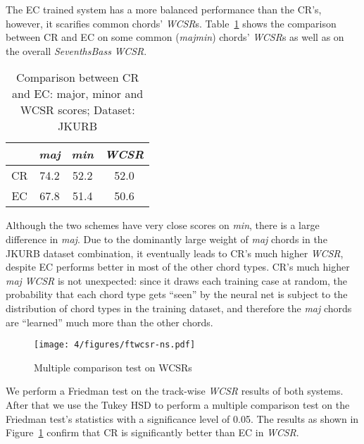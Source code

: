 The EC trained system has a more balanced performance than the CR's, however, it scarifies common chords' \textit{WCSR}s. Table~\ref{tab:4-wcsr-ns} shows the comparison between CR and EC on some common (\textit{majmin}) \cite{burgoyne2011expert} chords' \textit{WCSR}s as well as on the overall \textit{SeventhsBass} \textit{WCSR}.
\begin{table}[htb]
	\caption{Comparison between CR and EC: major, minor and WCSR scores; Dataset: JKURB}
	\centering
	\scriptsize
	\begin{tabular}{|c|c|c|c|} \hline
		& \textit{maj} & \textit{min} & \textit{WCSR} \\ \hline
		CR & 74.2 & 52.2 & 52.0 \\ \hline
		EC &  67.8 & 51.4 & 50.6 \\ \hline
	\end{tabular}
	\label{tab:4-wcsr-ns}
\end{table}

Although the two schemes have very close scores on \textit{min}, there is a large difference in \textit{maj}. Due to the dominantly large weight of \textit{maj} chords in the JKURB dataset combination, it eventually leads to CR's much higher \textit{WCSR}, despite EC performs better in most of the other chord types. CR's much higher \textit{maj} \textit{WCSR} is not unexpected: since it draws each training case at random, the probability that each chord type gets ``seen'' by the neural net is subject to the distribution of chord types in the training dataset, and therefore the \textit{maj} chords are ``learned'' much more than the other chords.

\begin{figure}[h!]
	\centering
	\texttt{[image: 4/figures/ftwcsr-ns.pdf]}
	\caption{Multiple comparison test on WCSRs}
	\label{fig:4-ftwcsr-ns}
\end{figure}
We perform a Friedman test on the track-wise \textit{WCSR} results of both systems. After that we use the Tukey HSD to perform a multiple comparison test on the Friedman test's statistics with a significance level of 0.05. The results as shown in Figure~\ref{fig:4-ftwcsr-ns} confirm that CR is significantly better than EC in \textit{WCSR}.

